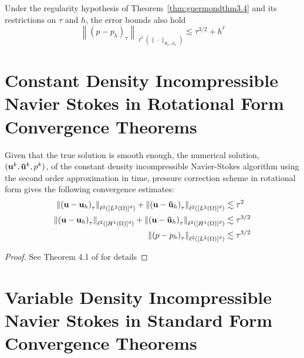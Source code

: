 \documentclass[letterpaper]{erdc}
\begin{document}
\begin{theorem}\label{thm:guermondthm3.5}
Under the regularity hypothesis of Theorem~\ref{thm:guermondthm3.4} and its restrictions on $\tau$ and $h$, the error bounds also hold
    \begin{equation}
      \left\| \left(p - p_h \right)_{\tau} \right\|_{\ell^{2}\left(\|\cdot\|_{B_h, \mathcal{A}_h}\right)} \lesssim \tau^{3/2} + h^{\ell}
    \end{equation}
\end{theorem}



\section{Constant Density Incompressible Navier Stokes in Rotational Form Convergence Theorems}

\begin{theorem}
Given that the true solution is smooth enough, the numerical solution, $(\textbf{u}^k, \mathbf{\tilde{u}}^k, p^k)$, of the constant density incompressible Navier-Stokes algorithm using the second order approximation in time, pressure correction scheme in rotational form gives the following convergence estimates:
\begin{align*}
\left\| \left(\textbf{u} - \textbf{u}_h\right)_{\tau} \right\|_{\ell^2\left([L^2(\Omega)]^d \right)} + \left\| \left(\textbf{u} - \mathbf{\tilde{u}}_h\right)_{\tau} \right\|_{\ell^2\left([L^2(\Omega)]^d \right)} &\lesssim \tau^2\\
\left\| \left(\textbf{u} - \textbf{u}_h\right)_{\tau} \right\|_{\ell^2\left([H^1(\Omega)]^d \right)} + \left\| \left(\textbf{u} - \mathbf{\tilde{u}}_h\right)_{\tau} \right\|_{\ell^2\left([H^1(\Omega)]^d \right)}  &\lesssim \tau^{3/2}\\
 \left\| \left(p - p_h\right)_{\tau} \right\|_{\ell^2\left([L^2(\Omega)]^d \right)} &\lesssim \tau^{3/2}
\end{align*}

\end{theorem}
\begin{proof}
See Theorem 4.1 of \cite{guermond2004error} for details
\end{proof}


\section{Variable Density Incompressible Navier Stokes in Standard Form Convergence Theorems}
\end{document}
